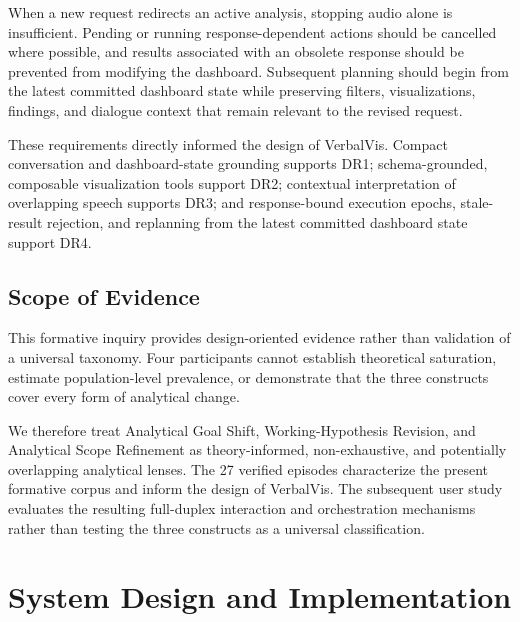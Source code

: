 \documentclass[journal]{IEEEtran}
\begin{document}
When a new request redirects an active analysis, stopping audio alone is
insufficient. Pending or running response-dependent actions should be cancelled
where possible, and results associated with an obsolete response should be
prevented from modifying the dashboard. Subsequent planning should begin from
the latest committed dashboard state while preserving filters,
visualizations, findings, and dialogue context that remain relevant to the
revised request.

These requirements directly informed the design of VerbalVis. Compact
conversation and dashboard-state grounding supports DR1; schema-grounded,
composable visualization tools support DR2; contextual interpretation of
overlapping speech supports DR3; and response-bound execution epochs,
stale-result rejection, and replanning from the latest committed dashboard
state support DR4.


\subsection{Scope of Evidence}
\label{sec:formative-scope}

This formative inquiry provides design-oriented evidence rather than
validation of a universal taxonomy. Four participants cannot establish
theoretical saturation, estimate population-level prevalence, or demonstrate
that the three constructs cover every form of analytical change.

We therefore treat Analytical Goal Shift, Working-Hypothesis Revision, and
Analytical Scope Refinement as theory-informed, non-exhaustive, and
potentially overlapping analytical lenses. The 27 verified episodes
characterize the present formative corpus and inform the design of VerbalVis.
The subsequent user study evaluates the resulting full-duplex interaction and
orchestration mechanisms rather than testing the three constructs as a
universal classification.






\section{System Design and Implementation}
\label{sec:system}
\end{document}
